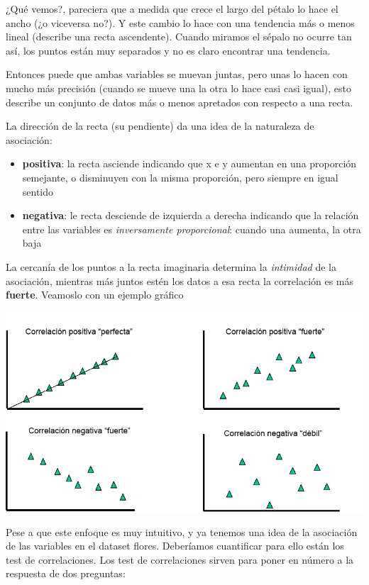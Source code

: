 \documentclass[
]{book}
\begin{document}
¿Qué vemos?, pareciera que a medida que crece el largo del pétalo lo hace el ancho (¿o viceversa no?). Y este cambio lo hace con una tendencia más o menos lineal (describe una recta ascendente). Cuando miramos el sépalo no ocurre tan así, los puntos están muy separados y no es claro encontrar una tendencia.

Entonces puede que ambas variables se muevan juntas, pero unas lo hacen con mucho más precisión (cuando se mueve una la otra lo hace casi casi igual), esto describe un conjunto de datos más o menos apretados con respecto a una recta.

La dirección de la recta (su pendiente) da una idea de la naturaleza de asociación:

\begin{itemize}
\item
  \textbf{positiva}: la recta asciende indicando que x e y aumentan en una proporción semejante, o disminuyen con la misma proporción, pero siempre en igual sentido
\item
  \textbf{negativa}: le recta desciende de izquierda a derecha indicando que la relación entre las variables es \emph{inversamente proporcional}: cuando una aumenta, la otra baja
\end{itemize}

La cercanía de los puntos a la recta imaginaria determina la \emph{intimidad} de la asociación, mientras más juntos estén los datos a esa recta la correlación es más \textbf{fuerte}. Veamoslo con un ejemplo gráfico

\includegraphics[width=11.11in]{img/Correlation}

Pese a que este enfoque es muy intuitivo, y ya tenemos una idea de la asociación de las variables en el dataset flores. Deberíamos cuantificar para ello están los test de correlaciones. Los test de correlaciones sirven para poner en número a la respuesta de dos preguntas:
\end{document}
